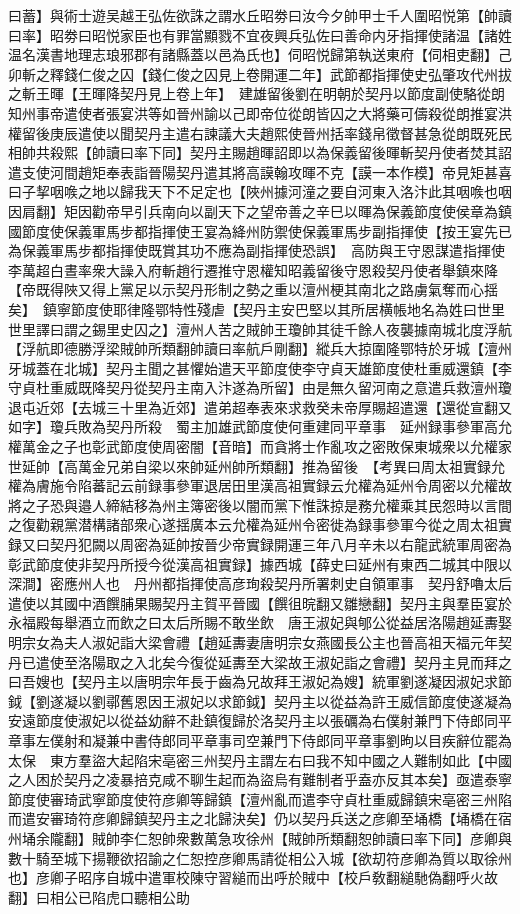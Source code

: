 曰蓄】與術士遊吴越王弘佐欲誅之謂水丘昭劵曰汝今夕帥甲士千人圍昭悦第【帥讀曰率】昭劵曰昭悦家臣也有罪當顯戮不宜夜興兵弘佐曰善命内牙指揮使諸温【諸姓温名漢書地理志琅邪郡有諸縣蓋以邑為氏也】伺昭悦歸第執送東府【伺相吏翻】己卯斬之釋錢仁俊之囚【錢仁俊之囚見上卷開運二年】武節都指揮使史弘肇攻代州拔之斬王暉【王暉降契丹見上卷上年】　建雄留後劉在明朝於契丹以節度副使駱從朗知州事帝遣使者張宴洪等如晉州諭以己即帝位從朗皆囚之大將藥可儔殺從朗推宴洪權留後庚辰遣使以聞契丹主遣右諫議大夫趙熙使晉州括率錢帛徵督甚急從朗既死民相帥共殺熙【帥讀曰率下同】契丹主賜趙暉詔即以為保義留後暉斬契丹使者焚其詔遣支使河間趙矩奉表詣晉陽契丹遣其將高謨翰攻暉不克【謨一本作模】帝見矩甚喜曰子挈咽㗋之地以歸我天下不足定也【陜州據河潼之要自河東入洛汴此其咽㗋也咽因肩翻】矩因勸帝早引兵南向以副天下之望帝善之辛巳以暉為保義節度使侯章為鎮國節度使保義軍馬步都指揮使王宴為絳州防禦使保義軍馬步副指揮使【按王宴先已為保義軍馬步都指揮使既賞其功不應為副指揮使恐誤】　高防與王守恩謀遣指揮使李萬超白晝率衆大譟入府斬趙行遷推守恩權知昭義留後守恩殺契丹使者舉鎮來降【帝既得陜又得上黨足以示契丹形制之勢之重以澶州梗其南北之路虜氣奪而心揺矣】　鎮寧節度使耶律隆鄂特性殘虐【契丹主安巴堅以其所居横帳地名為姓曰世里世里譯曰謂之錫里史囚之】澶州人苦之賊帥王瓊帥其徒千餘人夜襲據南城北度浮航【浮航即德勝浮梁賊帥所類翻帥讀曰率航戶剛翻】縱兵大掠圍隆鄂特於牙城【澶州牙城蓋在北城】契丹主聞之甚懼始遣天平節度使李守貞天雄節度使杜重威還鎮【李守貞杜重威既降契丹從契丹主南入汴遂為所留】由是無久留河南之意遣兵救澶州瓊退屯近郊【去城三十里為近郊】遣弟超奉表來求救癸未帝厚賜超遣還【還從宣翻又如字】瓊兵敗為契丹所殺　蜀主加雄武節度使何重建同平章事　延州録事參軍高允權萬金之子也彰武節度使周密闇【音暗】而貪將士作亂攻之密敗保東城衆以允權家世延帥【高萬金兄弟自梁以來帥延州帥所類翻】推為留後　【考異曰周太祖實録允權為膚施令陷蕃記云前録事參軍退居田里漢高祖實録云允權為延州令周密以允權故將之子恐與邉人締結移為州主簿密後以闇而黨下惟誅掠是務允權乘其民怨時以言間之復勸親黨潜構諸部衆心遂揺廣本云允權為延州令密徙為録事參軍今從之周太祖實録又曰契丹犯闕以周密為延帥按晉少帝實録開運三年八月辛未以右龍武統軍周密為彰武節度使非契丹所授今從漢高祖實録】據西城【薛史曰延州有東西二城其中限以深澗】密應州人也　丹州都指揮使高彦珣殺契丹所署刺史自領軍事　契丹舒嚕太后遣使以其國中酒饌脯果賜契丹主賀平晉國【饌徂晥翻又雛戀翻】契丹主與羣臣宴於永福殿每舉酒立而飲之曰太后所賜不敢坐飲　唐王淑妃與郇公從益居洛陽趙延夀娶明宗女為夫人淑妃詣大梁會禮【趙延夀妻唐明宗女燕國長公主也晉高祖天福元年契丹已遣使至洛陽取之入北矣今復從延夀至大梁故王淑妃詣之會禮】契丹主見而拜之曰吾嫂也【契丹主以唐明宗年長于齒為兄故拜王淑妃為嫂】統軍劉遂凝因淑妃求節鉞【劉遂凝以劉鄩舊恩因王淑妃以求節鉞】契丹主以從益為許王威信節度使遂凝為安遠節度使淑妃以從益幼辭不赴鎮復歸於洛契丹主以張礪為右僕射兼門下侍郎同平章事左僕射和凝兼中書侍郎同平章事司空兼門下侍郎同平章事劉昫以目疾辭位罷為太保　東方羣盜大起陷宋亳密三州契丹主謂左右曰我不知中國之人難制如此【中國之人困於契丹之凌暴掊克咸不聊生起而為盜烏有難制者乎盍亦反其本矣】亟遣泰寧節度使審琦武寧節度使符彦卿等歸鎮【澶州亂而遣李守貞杜重威歸鎮宋亳密三州陷而遣安審琦符彦卿歸鎮契丹主之北歸決矣】仍以契丹兵送之彦卿至埇橋【埇橋在宿州埇余隴翻】賊帥李仁恕帥衆數萬急攻徐州【賊帥所類翻恕帥讀曰率下同】彦卿與數十騎至城下揚鞭欲招諭之仁恕控彦卿馬請從相公入城【欲刧符彦卿為質以取徐州也】彦卿子昭序自城中遣軍校陳守習縋而出呼於賊中【校戶敎翻縋馳偽翻呼火故翻】曰相公已陷虎口聽相公助
